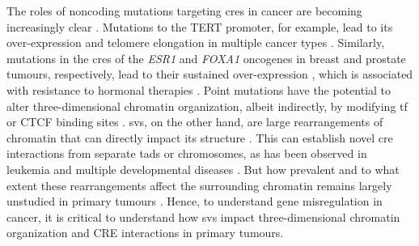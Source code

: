 The roles of noncoding mutations targeting \glspl{cre} in cancer are becoming increasingly clear \cite{zhouEmergenceNoncodingCancer2016,rheinbayAnalysesNoncodingSomatic2020,liPatternsSomaticStructural2020}.
Mutations to the TERT promoter, for example, lead to its over-expression and telomere elongation in multiple cancer types \cite{vinagreFrequencyTERTPromoter2013,huangHighlyRecurrentTERT2013,sternMutationTERTPromoter2015}.
Similarly, mutations in the \glspl{cre} of the \emph{ESR1} and \emph{FOXA1} oncogenes in breast and prostate tumours, respectively, lead to their sustained over-expression \cite{baileyNoncodingSomaticInherited2016,zhouNoncodingMutationsTarget2020,paroliaDistinctStructuralClasses2019}, which is associated with resistance to hormonal therapies \cite{jeselsohnESR1MutationsMechanism2015,robinsonFoxA1KeyMediator2012,fuFOXA1OverexpressionMediates2016,fuFOXA1UpregulationPromotes2019}.
Point mutations have the potential to alter three-dimensional chromatin organization, albeit indirectly, by modifying \gls{tf} or CTCF binding sites \cite{mauranoLargescaleIdentificationSequence2015,guoMutationHotspotsCTCF2018}.
\glspl{sv}, on the other hand, are large rearrangements of chromatin that can directly impact its structure \cite{dixonIntegrativeDetectionAnalysis2018,akdemirDisruptionChromatinFolding2020}.
This can establish novel \gls{cre} interactions from separate \glspl{tad} or chromosomes, as has been observed in leukemia \cite{hniszActivationProtooncogenesDisruption2016} and multiple developmental diseases \cite{lupianezDisruptionsTopologicalChromatin2015,allouNoncodingDeletionsIdentify2021}.
But how prevalent and to what extent these rearrangements affect the surrounding chromatin remains largely unstudied in primary tumours \cite{akdemirDisruptionChromatinFolding2020,liPatternsSomaticStructural2020,iyyankiSubtypeassociatedEpigenomicLandscape2021}.
Hence, to understand gene misregulation in cancer, it is critical to understand how \glspl{sv} impact three-dimensional chromatin organization and CRE interactions in primary tumours.

